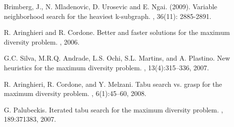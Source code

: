 \documentclass{ci5652}
\begin{document}

\small


\begin{thebibliography}{99}

Brimberg, J., N. Mladenovic, D. Urosevic and E. Ngai. (2009).
\newblock Variable neighborhood search for the heaviest k-subgraph.
, 36(11): 2885-2891.

R. Aringhieri and R. Cordone.
\newblock Better and faster solutions for the maximum diversity problem.
, 2006.

G.C. Silva, M.R.Q. Andrade, L.S. Ochi, S.L. Martins, and A. Plastino.
\newblock New heuristics for the maximum diversity problem.
, 13(4):315–336, 2007.

R. Aringhieri, R. Cordone, and Y. Melzani.
\newblock Tabu search vs. grasp for the maximum diversity problem.
, 6(1):45–60, 2008.

G. Palubeckis.
\newblock Iterated tabu search for the maximum diversity problem.
, 189:371383, 2007.




\end{thebibliography}
\end{document}
